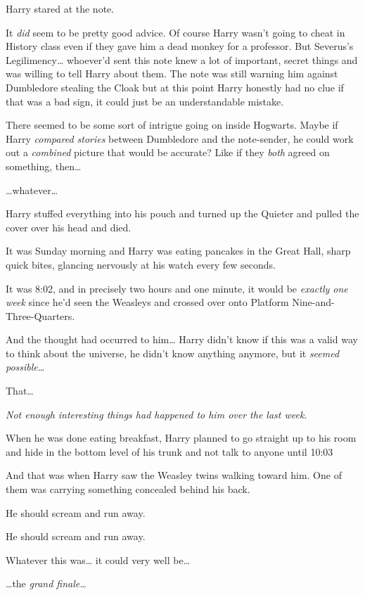 Harry stared at the note.

It \emph{did} seem to be pretty good advice. Of course Harry wasn't going to cheat in History class even if they gave him a dead monkey for a professor. But Severus's Legilimency{\ldots} whoever'd sent this note knew a lot of important, secret things and was willing to tell Harry about them. The note was still warning him against Dumbledore stealing the Cloak but at this point Harry honestly had no clue if that was a bad sign, it could just be an understandable mistake.

There seemed to be some sort of intrigue going on inside Hogwarts. Maybe if Harry \emph{compared stories} between Dumbledore and the note-sender, he could work out a \emph{combined} picture that would be accurate? Like if they \emph{both} agreed on something, then{\ldots}

{\ldots}whatever{\ldots}

Harry stuffed everything into his pouch and turned up the Quieter and pulled the cover over his head and died.

\later

It was Sunday morning and Harry was eating pancakes in the Great Hall, sharp quick bites, glancing nervously at his watch every few seconds.

It was 8:02\am, and in precisely two hours and one minute, it would be \emph{exactly one week} since he'd seen the Weasleys and crossed over onto Platform Nine-and-Three-Quarters.

And the thought had occurred to him{\ldots} Harry didn't know if this was a valid way to think about the universe, he didn't know anything anymore, but it \emph{seemed possible{\ldots}}

That{\ldots}

\emph{Not enough interesting things had happened to him over the last week.}

When he was done eating breakfast, Harry planned to go straight up to his room and hide in the bottom level of his trunk and not talk to anyone until 10:03\am

And that was when Harry saw the Weasley twins walking toward him. One of them was carrying something concealed behind his back.

He should scream and run away.

He should scream and run away.

Whatever this was{\ldots} it could very well be{\ldots}

{\ldots}the \emph{grand finale{\ldots}}

